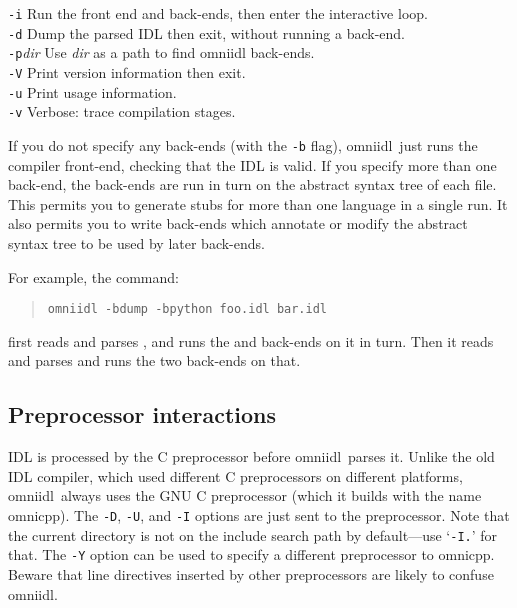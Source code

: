\documentclass[11pt,twoside,a4paper]{article}
\newcommand{\omniidl}{\textsf{omniidl}}
\newcommand{\cmdline}[1]{\texttt{#1}}
\begin{document}
\begin{tabbing}
\cmdline{-i}
     \> Run the front end and back-ends, then enter the interactive loop.\\

\cmdline{-d}
     \> Dump the parsed IDL then exit, without running a back-end.\\

\cmdline{-p}\textit{dir}
     \> Use \textit{dir} as a path to find omniidl back-ends.\\

\cmdline{-V}
     \> Print version information then exit.\\

\cmdline{-u}
     \> Print usage information.\\

\cmdline{-v}
     \> Verbose: trace compilation stages.\\

\end{tabbing}


If you do not specify any back-ends (with the \cmdline{-b} flag),
\omniidl\ just runs the compiler front-end, checking that the IDL is
valid. If you specify more than one back-end, the back-ends are run in
turn on the abstract syntax tree of each file. This permits you to
generate stubs for more than one language in a single run. It also
permits you to write back-ends which annotate or modify the abstract
syntax tree to be used by later back-ends.

For example, the command:

\begin{quote}
\cmdline{omniidl -bdump -bpython foo.idl bar.idl}
\end{quote}

\noindent first reads and parses , and runs the
 and  back-ends on it in turn. Then it reads
and parses  and runs the two back-ends on that.


\subsection{Preprocessor interactions}

IDL is processed by the C preprocessor before \omniidl\ parses it.
Unlike the old IDL compiler, which used different C preprocessors on
different platforms, \omniidl\ always uses the GNU C preprocessor
(which it builds with the name omnicpp). The \cmdline{-D},
\cmdline{-U}, and \cmdline{-I} options are just sent to the
preprocessor. Note that the current directory is not on the include
search path by default---use `\cmdline{-I.}' for that. The
\cmdline{-Y} option can be used to specify a different preprocessor to
omnicpp. Beware that line directives inserted by other preprocessors
are likely to confuse \omniidl.
\end{document}

